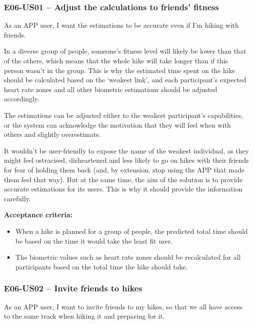 \subsubsection*{E06-US01 -- Adjust the calculations to friends' fitness}
As an APP user, I want the estimations to be accurate even if I'm hiking with friends.

In a diverse group of people, someone's fitness level will likely be lower than that of the others, which means that the whole hike will take longer than if this person wasn't in the group.
This is why the estimated time spent on the hike should be calculated based on the `weakest link', and each participant's expected heart rate zones and all other biometric estimations should be adjusted accordingly.

The estimations can be adjusted either to the weakest participant's capabilities, or the system can acknowledge the motivation that they will feel when with others and slightly overestimate.

It wouldn't be user-friendly to expose the name of the weakest individual, as they might feel ostracised, disheartened and less likely to go on hikes with their friends for fear of holding them back
(and, by extension, stop using the APP that made them feel that way).
But at the same time, the aim of the solution is to provide accurate estimations for its users.
This is why it should provide the information carefully.

\textbf{Acceptance criteria:}
\begin{itemize}
    \item When a hike is planned for a group of people, the predicted total time should be based on the time it would take the least fit user.
    \item The biometric values such as heart rate zones should be recalculated for all participants based on the total time the hike should take.
\end{itemize}


\subsubsection*{E06-US02 -- Invite friends to hikes}
As an APP user, I want to invite friends to my hikes, so that we all have access to the same track when hiking it and preparing for it.

